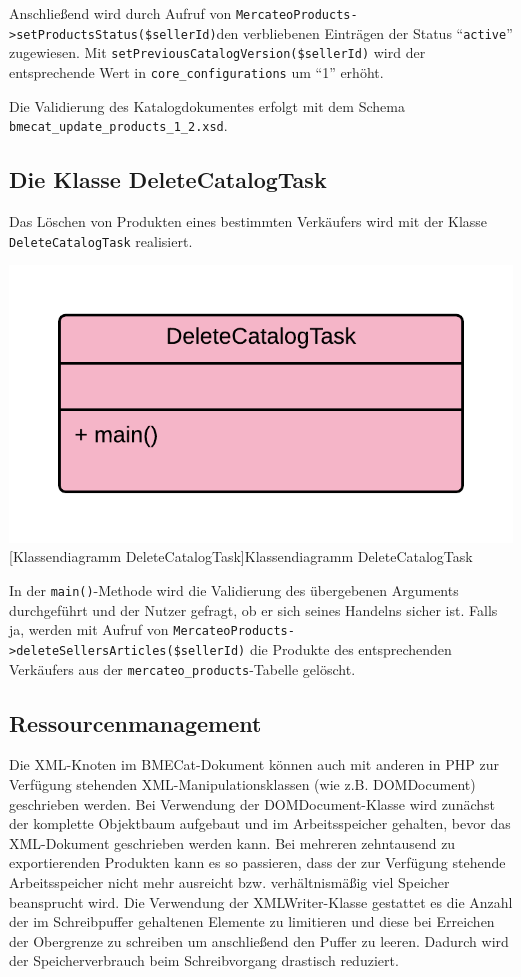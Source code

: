 {	Anschließend wird durch Aufruf von \texttt{MercateoProducts->setProductsStatus(\$sellerId)}den verbliebenen Einträgen der Status \enquote{\texttt{active}} zugewiesen. Mit \texttt{setPreviousCatalogVersion(\$seller\-Id)} wird der entsprechende Wert in \texttt{core\_configurations} um \enquote{1} erhöht.
	
	Die Validierung des Katalogdokumentes erfolgt mit dem Schema \texttt{bmecat\_update\_products\_1\_2.xsd}.
	
	\subsection{Die Klasse DeleteCatalogTask}
	
	Das Löschen von Produkten eines bestimmten Verkäufers wird mit der Klasse \texttt{DeleteCatalogTask} realisiert. 
	
	\begin{minipage}{\linewidth}
		\vspace{1em}
		\centering
		\includegraphics[width=0.4 \linewidth]{img/DeleteCatalogTask}
		[Klassendiagramm DeleteCatalogTask]{Klassendiagramm DeleteCatalogTask}
		\vspace{1em}
	\end{minipage}	
	
	In der \texttt{main()}-Methode wird die Validierung des übergebenen Arguments durchgeführt und der Nutzer gefragt, ob er sich seines Handelns sicher ist. Falls ja, werden mit Aufruf von \texttt{MercateoProducts->deleteSellers\-Articles(\$sellerId)} die Produkte des entsprechenden Verkäufers aus der \texttt{mercateo\_products}-Tabelle gelöscht.
	\clearpage
	\subsection{Ressourcenmanagement}
	
	Die XML-Knoten im BMECat-Dokument können auch mit anderen in PHP zur Verfügung stehenden XML-Manipulationsklassen (wie z.B.  DOMDocument) geschrieben werden. Bei Verwendung der DOMDocument-Klasse wird zunächst der komplette Objektbaum aufgebaut und im Arbeitsspeicher gehalten, bevor das XML-Dokument geschrieben werden kann. Bei mehreren zehntausend zu exportierenden Produkten kann es so passieren, dass der zur Verfügung stehende Arbeitsspeicher nicht mehr ausreicht bzw. verhältnismäßig viel Speicher beansprucht wird. Die Verwendung der XMLWriter-Klasse gestattet es die Anzahl der im Schreibpuffer gehaltenen Elemente zu limitieren und diese bei Erreichen der Obergrenze zu schreiben um anschließend den Puffer zu leeren. Dadurch wird der Speicherverbrauch beim Schreibvorgang drastisch reduziert. 
		
}

